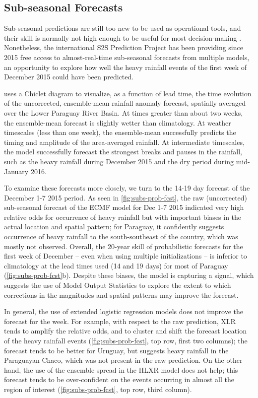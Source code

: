 \documentclass{ametsoc}
\begin{document}
\subsection{Sub-seasonal Forecasts}

Sub-seasonal predictions are still too new to be used as operational tools, and their skill is normally not high enough to be useful for most decision-making \citep{Vigaud:2017gg}.
Nonetheless, the international S2S Prediction Project \citep{Vitart2016} has been providing since 2015 free access to almost-real-time sub-seasonal forecasts from multiple models, an opportunity to explore how well the heavy rainfall events of the first week of December 2015 could have been predicted.

 uses a Chiclet diagram \citep{Carbin:2016fx} to visualize, as a function of lead time, the time evolution of the uncorrected, ensemble-mean rainfall anomaly forecast, spatially averaged over the Lower Paraguay River Basin.
At times greater than about two weeks, the ensemble-mean forecast is slightly wetter than climatology.
At weather timescales (less than one week), the ensemble-mean successfully predicts the timing and amplitude of the area-averaged rainfall.
At intermediate timescales, the model successfully forecast the strongest breaks and pauses in the rainfall, such as the heavy rainfall during December 2015 and the dry period during mid-January 2016.

To examine these forecasts more closely, we turn to the 14-19 day forecast of the December 1-7 2015 period.
As seen in \cref{fig:subs-prob-fcst}, the raw (uncorrected) sub-seasonal forecast of the ECMF model for Dec 1-7 2015 indicated very high relative odds for occurrence of heavy rainfall but with important biases in the actual location and spatial pattern; for Paraguay, it confidently suggests occurrence of heavy rainfall to the south-southeast of the country, which was mostly not observed.
Overall, the 20-year skill of probabilistic forecasts for the first week of December -- even when using  multiple initializations -- is inferior to climatology at the lead times used (14 and 19 days) for most of Paraguay (\cref{fig:subs-prob-fcst}b).
Despite these biases, the model is capturing a signal, which suggests the use of Model Output Statistics to explore the extent to which corrections in the magnitudes and spatial patterns may improve the forecast.

In general, the use of extended logistic regression models does not improve the forecast for the week.
For example, with respect to the raw prediction, XLR tends to amplify the relative odds, and to cluster and shift the forecast location of the heavy rainfall events (\cref{fig:subs-prob-fcst}, top row, first two columns); the forecast tends to be better for Uruguay, but suggests heavy rainfall in the Paraguayan Chaco, which was not present in the raw prediction.
On the other hand, the use of the ensemble spread in the HLXR model does not help; this forecast tends to be over-confident on the events occurring in almost all the region of interest (\cref{fig:subs-prob-fcst}, top row, third column).
\end{document}
